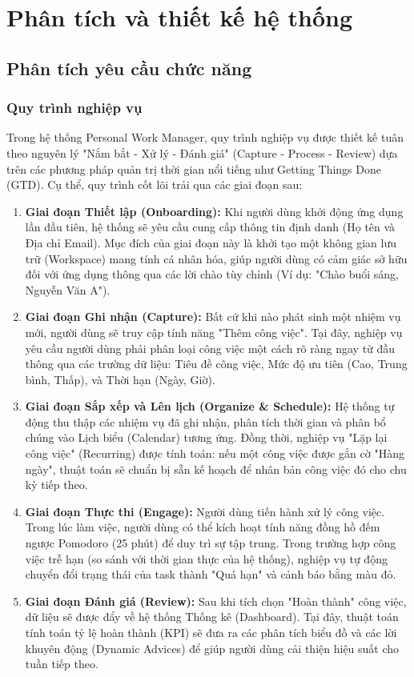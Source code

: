 \section{Phân tích và thiết kế hệ thống}

\subsection{Phân tích yêu cầu chức năng}

\subsubsection{Quy trình nghiệp vụ}
Trong hệ thống Personal Work Manager, quy trình nghiệp vụ được thiết kế tuân theo nguyên lý "Nắm bắt - Xử lý - Đánh giá" (Capture - Process - Review) dựa trên các phương pháp quản trị thời gian nổi tiếng như Getting Things Done (GTD). Cụ thể, quy trình cốt lõi trải qua các giai đoạn sau:

\begin{enumerate}
    \item \textbf{Giai đoạn Thiết lập (Onboarding):} Khi người dùng khởi động ứng dụng lần đầu tiên, hệ thống sẽ yêu cầu cung cấp thông tin định danh (Họ tên và Địa chỉ Email). Mục đích của giai đoạn này là khởi tạo một không gian lưu trữ (Workspace) mang tính cá nhân hóa, giúp người dùng có cảm giác sở hữu đối với ứng dụng thông qua các lời chào tùy chỉnh (Ví dụ: "Chào buổi sáng, Nguyễn Văn A").
    \item \textbf{Giai đoạn Ghi nhận (Capture):} Bất cứ khi nào phát sinh một nhiệm vụ mới, người dùng sẽ truy cập tính năng "Thêm công việc". Tại đây, nghiệp vụ yêu cầu người dùng phải phân loại công việc một cách rõ ràng ngay từ đầu thông qua các trường dữ liệu: Tiêu đề công việc, Mức độ ưu tiên (Cao, Trung bình, Thấp), và Thời hạn (Ngày, Giờ).
    \item \textbf{Giai đoạn Sắp xếp và Lên lịch (Organize \& Schedule):} Hệ thống tự động thu thập các nhiệm vụ đã ghi nhận, phân tích thời gian và phân bổ chúng vào Lịch biểu (Calendar) tương ứng. Đồng thời, nghiệp vụ "Lặp lại công việc" (Recurring) được tính toán: nếu một công việc được gắn cờ "Hàng ngày", thuật toán sẽ chuẩn bị sẵn kế hoạch để nhân bản công việc đó cho chu kỳ tiếp theo.
    \item \textbf{Giai đoạn Thực thi (Engage):} Người dùng tiến hành xử lý công việc. Trong lúc làm việc, người dùng có thể kích hoạt tính năng đồng hồ đếm ngược Pomodoro (25 phút) để duy trì sự tập trung. Trong trường hợp công việc trễ hạn (so sánh với thời gian thực của hệ thống), nghiệp vụ tự động chuyển đổi trạng thái của task thành "Quá hạn" và cảnh báo bằng màu đỏ.
    \item \textbf{Giai đoạn Đánh giá (Review):} Sau khi tích chọn "Hoàn thành" công việc, dữ liệu sẽ được đẩy về hệ thống Thống kê (Dashboard). Tại đây, thuật toán tính toán tỷ lệ hoàn thành (KPI) sẽ đưa ra các phân tích biểu đồ và các lời khuyên động (Dynamic Advices) để giúp người dùng cải thiện hiệu suất cho tuần tiếp theo.
\end{enumerate}

